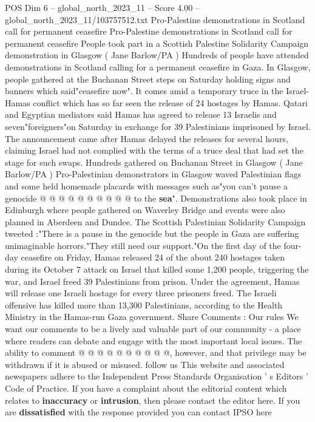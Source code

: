 \begin{textsample}{POS Dim 6 – global\_north\_2023\_11 – Score 4.00 – global\_north\_2023\_11/103757512.txt}  \label{ex:f6_pos_217}
Pro-Palestine demonstrations in Scotland call for permanent ceasefire Pro-Palestine demonstrations in Scotland call for permanent ceasefire People took part in a Scottish Palestine Solidarity Campaign demonstration in Glasgow ( Jane Barlow/PA ) Hundreds of people have attended demonstrations in Scotland calling for a permanent ceasefire in Gaza.
In Glasgow, people gathered at the Buchanan Street steps on Saturday holding signs and banners which said"ceasefire now".
It comes amid a temporary truce in the Israel-Hamas conflict which has so far seen the release of 24 hostages by Hamas.
Qatari and Egyptian mediators said Hamas has agreed to release 13 Israelis and seven"foreigners"on Saturday in exchange for 39 Palestinians imprisoned by Israel.
The announcement came after Hamas delayed the releases for several hours, claiming Israel had not complied with the terms of a truce deal that had set the stage for such swaps.
Hundreds gathered on Buchanan Street in Glasgow ( Jane Barlow/PA ) Pro-Palestinian demonstrators in Glasgow waved Palestinian flags and some held homemade placards with messages such as"you can't pause a genocide @ @ @ @ @ @ @ @ @ @ to the \textbf{sea}".
Demonstrations also took place in Edinburgh where people gathered on Waverley Bridge and events were also planned in Aberdeen and Dundee.
The Scottish Palestinian Solidarity Campaign tweeted :"There is a pause in the genocide but the people in Gaza are suffering unimaginable horrors."They still need our support."On the first day of the four-day ceasefire on Friday, Hamas released 24 of the about 240 hostages taken during its October 7 attack on Israel that killed some 1,200 people, triggering the war, and Israel freed 39 Palestinians from prison.
Under the agreement, Hamas will release one Israeli hostage for every three prisoners freed.
The Israeli offensive has killed more than 13,300 Palestinians, according to the Health Ministry in the Hamas-run Gaza government.
Share Comments : Our rules We want our comments to be a lively and valuable part of our community - a place where readers can debate and engage with the most important local issues.
The ability to comment @ @ @ @ @ @ @ @ @ @, however, and that privilege may be withdrawn if it is abused or misused. follow us This website and associated newspapers adhere to the Independent Press Standards Organisation ' s Editors ' Code of Practice.
If you have a complaint about the editorial content which relates to \textbf{inaccuracy} or \textbf{intrusion}, then please contact the editor here.
If you are \textbf{dissatisfied} with the response provided you can contact IPSO here

\end{textsample}
